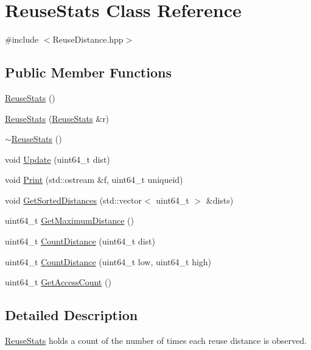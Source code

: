 \hypertarget{class_reuse_stats}{
\section{ReuseStats Class Reference}
\label{class_reuse_stats}
}


{\ttfamily \#include $<$ReuseDistance.hpp$>$}

\subsection*{Public Member Functions}
\begin{DoxyCompactItemize}
\item 
\hyperlink{class_reuse_stats_a0106660db234ec0ea484c61cb18702e8}{ReuseStats} ()
\item 
\hyperlink{class_reuse_stats_a5c7df5f020e0f87e78b8f49c5624c823}{ReuseStats} (\hyperlink{class_reuse_stats}{ReuseStats} \&r)
\item 
\hyperlink{class_reuse_stats_a21f8a5cab3976edba08c2562c3ed8d45}{$\sim$ReuseStats} ()
\item 
void \hyperlink{class_reuse_stats_a5383136c63ed260d9aad44a8d048a2ed}{Update} (uint64\_\-t dist)
\item 
void \hyperlink{class_reuse_stats_a9edd9703b7de1998042cd5f72056d68a}{Print} (std::ostream \&f, uint64\_\-t uniqueid)
\item 
void \hyperlink{class_reuse_stats_adcb657e303c090ac5ef210f6c4506986}{GetSortedDistances} (std::vector$<$ uint64\_\-t $>$ \&dists)
\item 
uint64\_\-t \hyperlink{class_reuse_stats_ac70175a532ea2dc608e0fd2f04e4fcbb}{GetMaximumDistance} ()
\item 
uint64\_\-t \hyperlink{class_reuse_stats_abdb92b77ec7191be80e77a34f894e11b}{CountDistance} (uint64\_\-t dist)
\item 
uint64\_\-t \hyperlink{class_reuse_stats_a07265484c0c3b4348ea090d28de37cbe}{CountDistance} (uint64\_\-t low, uint64\_\-t high)
\item 
uint64\_\-t \hyperlink{class_reuse_stats_a48935d131ce635b1b37b2a43f0c52217}{GetAccessCount} ()
\end{DoxyCompactItemize}


\subsection{Detailed Description}
\hyperlink{class_reuse_stats}{ReuseStats} holds a count of the number of times each reuse distance is observed. 

